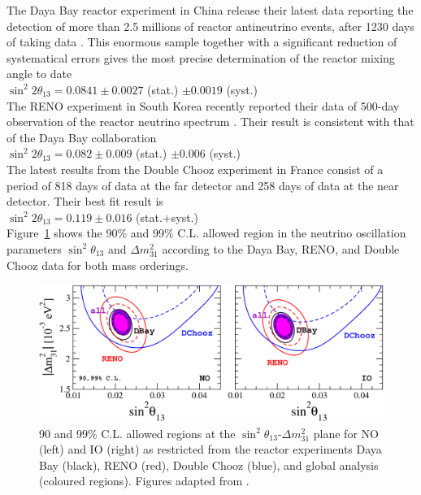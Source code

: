 \documentclass[english]{article}
\begin{document}
    The Daya Bay reactor experiment \cite{dayabay} in China release their latest data reporting the detection of more than 2.5 millions of reactor antineutrino events, after 1230 days of taking data \cite{dayabaydata}. This enormous sample together with a significant reduction of systematical errors gives the most precise determination of the reactor mixing angle to date\\
    
    $\sin^{2}{2\theta_{13}} = 0.0841 \pm 0.0027$ (stat.) $\pm 0.0019$ (syst.)\\
    
    The RENO experiment \cite{reno} in South Korea recently reported their data of 500-day observation of the reactor neutrino spectrum \cite{renodata}. Their result is consistent with that of the Daya Bay collaboration\\
    
    $\sin^{2}{2\theta_{13}} = 0.082 \pm 0.009$ (stat.) $\pm 0.006$ (syst.)\\
    
    The latest results from the Double Chooz experiment in France consist of a period of 818 days of data at the far detector and 258 days of data at the near detector. Their best fit result is \cite{doublechoozdata}\\
    
    $\sin^{2}{2\theta_{13}} = 0.119 \pm 0.016$ (stat.$+$syst.)\\
    
    Figure~\ref{fig:sq13-mq31-reactor} shows the 90\% and 99\% C.L. allowed region in the neutrino oscillation parameters $\sin^{2}{\theta_{13}}$ and $\Delta{m^{2}_{31}}$ according to the Daya Bay, RENO, and Double Chooz data for both mass orderings.
    
    \begin{figure}[!hbt]
		\begin{center}
        \centering
        \captionsetup{justification=centering}
		\includegraphics[scale=0.5]{sq13-mq31-reactor.pdf}
		\caption{90 and 99\% C.L. allowed regions at the $\sin^{2}{\theta_{13}}$-$\Delta{m^{2}_{31}}$ plane for NO (left) and IO (right) as restricted from the reactor experiments Daya Bay (black), RENO (red), Double Chooz (blue), and global analysis (coloured regions). Figures adapted from \cite{salas2018}.}
		\label{fig:sq13-mq31-reactor}
		\end{center}
	\end{figure}
\end{document}
